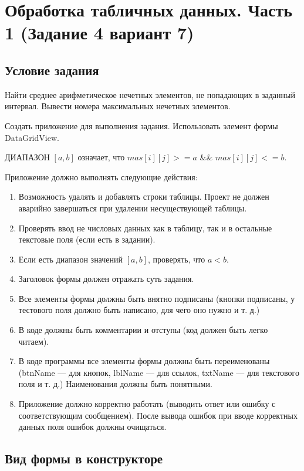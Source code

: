 \section{Обработка табличных данных. Часть 1 (Задание 4 вариант 7)}

\subsection{Условие задания}

Найти среднее арифметическое нечетных элементов, не попадающих в заданный интервал. Вывести номера максимальных нечетных элементов.

Создать приложение для выполнения задания. Использовать элемент формы DataGridView. 

ДИАПАЗОН $[a,b]$ означает, что $mas[i][j] >= a$ \&\& $mas[i][j] <= b$.

Приложение должно выполнять следующие действия:

\begin{enumerate}
    \item{Возможность удалять и добавлять строки таблицы. Проект не должен аварийно завершаться при удалении несуществующей таблицы.}
    \item{Проверять ввод не числовых данных как в таблицу, так и в остальные текстовые поля (если есть в задании).}
    \item{Если есть диапазон значений $[a,b]$, проверять, что $a < b$.}
    \item{Заголовок формы должен отражать суть задания.}
    \item{Все элементы формы должны быть внятно подписаны (кнопки подписаны, у тестового поля должно быть написано, для чего оно нужно и т. д.)}
    \item{В коде должны быть комментарии и отступы (код должен быть легко читаем).}
    \item{В коде программы все элементы формы должны быть переименованы (btnName ---  для кнопок, lblName --- для ссылок, txtName --- для текстового поля и т. д.) Наименования должны быть понятными.}
    \item{Приложение должно корректно работать (выводить ответ или ошибку с соответствующим сообщением). После вывода ошибок при вводе корректных данных поля ошибок должны очищаться.  }
\end{enumerate}

\subsection{Вид формы в конструкторе}

